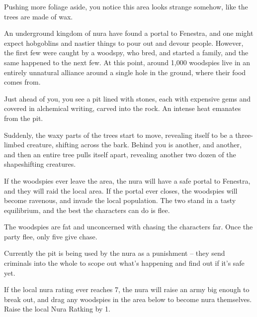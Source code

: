 \begin{multicols}{2}
\begin{boxtext}

	Pushing more foliage aside, you notice this area looks strange somehow, like the trees are made of wax.

\end{boxtext}

An underground kingdom of nura have found a portal to Fenestra, and one might expect hobgoblins and nastier things to pour out and devour people.
However, the first few were caught by a woodspy, who bred, and started a family, and the same happened to the next few.
At this point, around 1,000 woodspies live in an entirely unnatural alliance around a single hole in the ground, where their food comes from.

\begin{boxtext}

	Just ahead of you, you see a pit lined with stones, each with expensive gems and covered in alchemical writing, carved into the rock.
	An intense heat emanates from the pit.

	Suddenly, the waxy parts of the trees start to move, revealing itself to be a three-limbed creature, shifting across the bark.  Behind you is another, and another, and then an entire tree pulls itself apart, revealing another two dozen of the shapeshifting creatures.

\end{boxtext}

If the woodspies ever leave the area, the nura will have a safe portal to Fenestra, and they will raid the local area.
If the portal ever closes, the woodspies will become ravenous, and invade the local population.
The two stand in a tasty equilibrium, and the best the characters can do is flee.

The woodspies are fat and unconcerned with chasing the characters far.  Once the party flee, only five give chase.


Currently the pit is being used by the nura as a punishment -- they send criminals into the whole to scope out what's happening and find out if it's safe yet.

If the local nura rating ever reaches 7, the nura will raise an army big enough to break out, and drag any woodspies in the area below to become nura themselves.
Raise the local Nura Ratking by 1.


\end{multicols}

